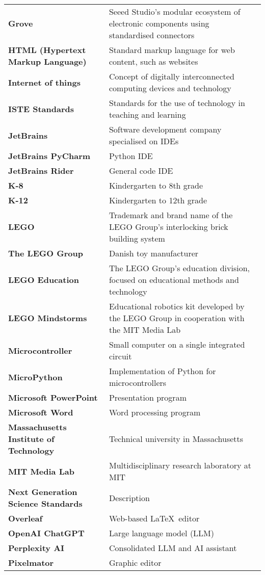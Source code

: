 {\begin{longtable}{>{\raggedright \bfseries}p{} p{}}
Grove               & Seeed Studio's modular ecosystem of electronic components using standardised connectors \\
HTML (Hypertext \quad \quad \quad Markup Language)& Standard markup language for web content, such as websites \\
Internet of things  & Concept of digitally interconnected computing devices and technology \\
ISTE Standards      & Standards for the use of technology in teaching and learning \\
JetBrains           & Software development company specialised on IDEs \\
JetBrains PyCharm   & Python IDE \\
JetBrains Rider     & General code IDE \\
K-8                 & Kindergarten to 8th grade \\
K-12                & Kindergarten to 12th grade \\
LEGO                & Trademark and brand name of the LEGO Group's interlocking brick building system \\
The LEGO Group      & Danish toy manufacturer \\
LEGO Education      & The LEGO Group's education division, focused on educational methods and technology \\
LEGO Mindstorms     & Educational robotics kit developed by the LEGO Group in cooperation with the MIT Media Lab \\
Microcontroller     & Small computer on a single integrated circuit \\
MicroPython         & Implementation of Python for microcontrollers \\
Microsoft PowerPoint& Presentation program \\
Microsoft Word      & Word processing program \\
Massachusetts Institute of Technology & Technical university in Massachusetts \\
MIT Media Lab       & Multidisciplinary research laboratory at MIT \\
Next Generation Science Standards & Description \\
Overleaf            & Web-based \LaTeX\ editor  \\
OpenAI ChatGPT      & Large language model (LLM) \\
Perplexity AI       & Consolidated LLM and AI assistant  \\
Pixelmator          & Graphic editor \\

\end{longtable}}
